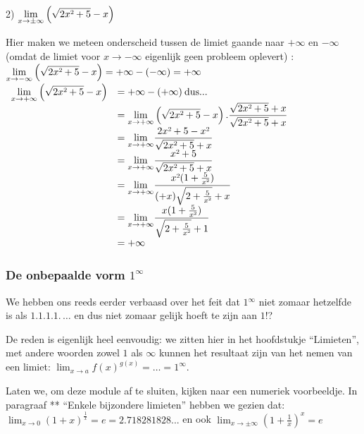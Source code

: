 2) ${\displaystyle {\displaystyle \lim_{x\to\pm\infty}}\left(\sqrt{2x\text{\texttwosuperior}+5}-x\right)}$

Hier maken we meteen onderscheid tussen de limiet gaande naar $+\infty$
en $-\infty$ (omdat de limiet voor $x\rightarrow-\infty$ eigenlijk
geen probleem oplevert) :
${\displaystyle {\displaystyle \lim_{x\to-\infty}}\left(\sqrt{2x\text{\texttwosuperior}+5}-x\right)=+\infty-(-\infty)=+\infty}$
$\begin{array}{cl}
{\displaystyle {\displaystyle {\displaystyle \lim_{x\to+\infty}}\left(\sqrt{2x\text{\texttwosuperior}+5}-x\right)}} & =+\infty-(+\infty)\:\mathrm{dus...}\\
 & {\displaystyle ={\displaystyle \lim_{x\to+\infty}}\left(\sqrt{2x\text{\texttwosuperior}+5}-x\right).\frac{\sqrt{2x\text{\texttwosuperior}+5}+x}{\sqrt{2x\text{\texttwosuperior}+5}+x}}\\
 & {\displaystyle ={\displaystyle \lim_{x\to+\infty}}\frac{2x\text{\texttwosuperior}+5-x\text{\texttwosuperior}}{\sqrt{2x\text{\texttwosuperior}+5}+x}}\\
 & {\displaystyle ={\displaystyle \lim_{x\to+\infty}}\frac{x\text{\texttwosuperior}+5}{\sqrt{2x\text{\texttwosuperior}+5}+x}}\\
 & {\displaystyle ={\displaystyle \lim_{x\to+\infty}}\frac{x\text{\texttwosuperior}(1+\frac{5}{x\text{\texttwosuperior}})}{(+x)\sqrt{2+\frac{5}{x\text{\texttwosuperior}}}+x}}\\
 & {\displaystyle ={\displaystyle \lim_{x\to+\infty}}\frac{x(1+\frac{5}{x\text{\texttwosuperior}})}{\sqrt{2+\frac{5}{x\text{\texttwosuperior}}}+1}}\\
 & =+\infty
\end{array}$ 

\subsubsection{De onbepaalde vorm $1^{\infty}$}

We hebben ons reeds eerder verbaasd over het feit dat $1{}^{\infty}$
niet zomaar hetzelfde is als $1.1.1.1.\,\ldots$ en dus niet zomaar
gelijk hoeft te zijn aan $1$!?

De reden is eigenlijk heel eenvoudig: we zitten hier in
het hoofdstukje ``Limieten'', met andere woorden zowel $1$ als
$\infty$ kunnen het resultaat zijn van het nemen van een limiet:
${\displaystyle \lim_{x\to a}f(x)^{g(x)}=\ldots=1^{\infty}}$.


Laten we, om deze module af te sluiten, kijken naar een
numeriek voorbeeldje. In paragraaf {*}{*} ``Enkele bijzondere limieten''
hebben we gezien dat: ${\displaystyle \lim_{x\to0}}\left(1+x\right)^{\frac{1}{x}}=e=2.718281828...$
en ook ${\displaystyle \lim_{x\to\pm\infty}}\left(1+\frac{1}{x}\right)^{x}=e$

